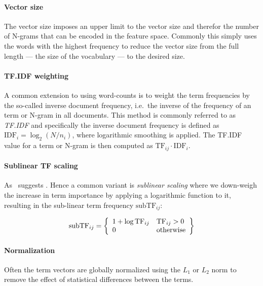 \paragraph{Vector size} The vector size imposes an upper limit to the vector size and therefor the number of N-grams that can be encoded in the feature space. Commonly this simply uses the words with the highest frequency to reduce the vector size from the full length --- the size of the vocabulary --- to the desired size.

\paragraph{TF.IDF weighting}
\label{par:TF.IDF weighting}
A common extension to using word-counts is to weight the term frequencies by the so-called inverse document frequency, i.e.\ the inverse of the frequency of an term or N-gram in all documents. This method is commonly referred to as \emph{TF.IDF} and specifically the inverse document frequency is defined as $\text{IDF}_i = \log_2 (N/n_i)$, where logarithmic smoothing is applied. The TF.IDF value for a term or N-gram is then computed as $\text{TF}_{ij} \cdot \text{IDF}_i$.

\paragraph{Sublinear TF scaling}
\label{par:Sublinear TF scaling}
 As~\cite[Chapter 6.4.1, p.~126]{Manning:2008aa} suggests . Hence a common variant is \emph{sublinear scaling} where we down-weigh the increase in term importance by applying a logarithmic function to it, resulting in the sub-linear term frequency $\text{subTF}_{ij}$:

\begin{displaymath}
  \text{subTF}_{ij} = \left \{ \begin{array}{l l} 1+\log \text{TF}_{ij} & \text{TF}_{ij} > 0 \\
  0 & \text{otherwise}
\end{array} \right \}
\end{displaymath}

\paragraph{Normalization} Often the term vectors are globally normalized using the $L_1$ or $L_2$ norm to remove the effect of statistical differences between the terms.

